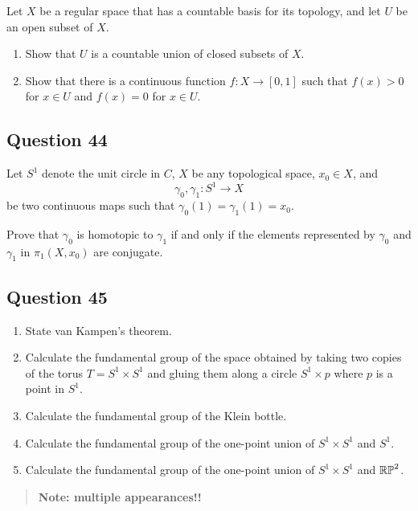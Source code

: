 \documentclass[12pt]{article}
\begin{document}
Let \(X\) be a regular space that has a countable basis for its
topology, and let \(U\) be an open subset of \(X\).

\begin{enumerate}
\def\labelenumi{\alph{enumi}.}
\item
  Show that \(U\) is a countable union of closed subsets of \(X\).
\item
  Show that there is a continuous function \(f : X \to [0,1]\) such that
  \(f (x) > 0\) for \(x \in U\) and \(f (x) = 0\) for \(x \in U\).
\end{enumerate}

\hypertarget{question-44-3}{%
\subsection{Question 44}\label{question-44-3}}

Let \(S^1\) denote the unit circle in \(C\), \(X\) be any topological
space, \(x_0 \in X\), and \[\gamma_0, \gamma_1 : S^1 \to X\] be two
continuous maps such that \(\gamma_0 (1) = \gamma_1 (1) = x_0\).

Prove that \(\gamma_0\) is homotopic to \(\gamma_1\) if and only if the
elements represented by \(\gamma_0\) and \(\gamma_1\) in
\(\pi_1 (X, x_0 )\) are conjugate.

\hypertarget{question-45-3}{%
\subsection{Question 45}\label{question-45-3}}

\begin{enumerate}
\def\labelenumi{\alph{enumi}.}
\item
  State van Kampen's theorem.
\item
  Calculate the fundamental group of the space obtained by taking two
  copies of the torus \(T = S^1 \times S^1\) and gluing them along a
  circle \(S^1 \times {p}\) where \(p\) is a point in \(S^1\).
\item
  Calculate the fundamental group of the Klein bottle.
\item
  Calculate the fundamental group of the one-point union of
  \(S^1 \times S^1\) and \(S^1\).
\item
  Calculate the fundamental group of the one-point union of
  \(S^1 \times S^1\) and \({\mathbb{RP}}^2\).
\end{enumerate}

\begin{quote}
\textbf{Note: multiple appearances!!}
\end{quote}
\end{document}
